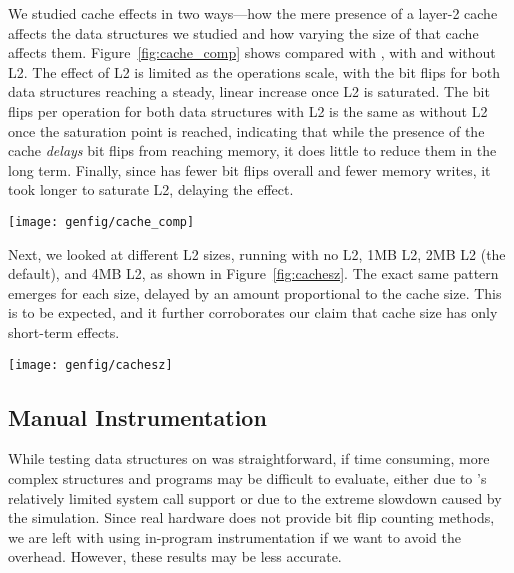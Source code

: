 We studied cache effects in two ways---how the mere presence of a layer-2
cache affects the data structures we studied and how varying the size
of that cache affects them. Figure~\ref{fig:cache_comp} shows \xrbt compared
with \rbt, with and without L2. The effect of L2 is limited as the
operations scale, with the bit flips for both data structures reaching a steady,
linear increase once L2 is saturated. The bit flips per operation for both data
structures with L2 is the same as without L2 once the saturation point is
reached, indicating that while the presence of the cache \textit{delays} bit
flips from reaching memory, it does little to reduce them in the long term.
Finally, since \xrbt has fewer bit flips overall and fewer memory writes, it
took longer to saturate L2, delaying the effect.


\begin{SCfigure}
	\centering
	\texttt{[image: genfig/cache\_comp]}
	\caption{Bits flipped by xrbt and rbt over a varying number of sequential
		inserts, with and without the L2 cache present.}
	\label{fig:cache_comp}
\end{SCfigure}

Next, we looked at different L2 sizes, running \xrbt with no L2, 1MB L2, 2MB L2
(the default), and 4MB L2, as shown in Figure~\ref{fig:cachesz}. The exact same
pattern emerges for each size, delayed by an amount proportional to the cache
size. This is to be expected, and it further corroborates our claim that cache
size has only short-term effects.

\begin{SCfigure}
	\centering
	\texttt{[image: genfig/cachesz]}
	\caption{Bits flipped by xrbt over a varying number of sequential
		inserts, with different sizes for L2.}
	\label{fig:cachesz}
\end{SCfigure}



\subsection{Manual Instrumentation}

While testing data structures on \gem was straightforward, if time
consuming, more complex structures and programs may be difficult to
evaluate, either due to \gem's relatively limited system call support or due to
the extreme slowdown caused by the simulation. Since real hardware does not
provide bit flip counting methods, we are left with using in-program
instrumentation if we want to avoid the \gem overhead. However, these results
may be less accurate.

